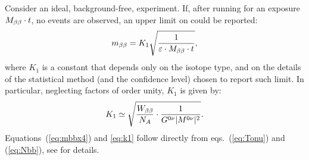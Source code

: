 
Consider an ideal, background-free, experiment. If, after running for an exposure $M_{\beta\beta}\cdot t$, no events are observed, an upper limit on \mbb could be reported:
%
\begin{equation}
m_{\beta\beta} = K_{1} \sqrt{\frac{1}{\varepsilon\cdot M_{\beta\beta} \cdot t}}, \label{eq:mbbx4}
\end{equation}
%
where $K_{1}$ is a constant that depends only on the isotope type, and on the details of the statistical method (and the confidence level) chosen to report such limit. In particular, neglecting factors of order unity, $K_{1}$ is given by:
%
\begin{equation}
K_{1} \simeq \sqrt{\frac{W_{\beta\beta}}{N_A}\cdot \frac{1}{G^{0\nu}\lvert M^{0\nu}\rvert^2}}. \label{eq:k1}
\end{equation}
%
Equations~(\ref{eq:mbbx4}) and \ref{eq:k1} follow directly from eqs.~(\ref{eq:Tonu}) and (\ref{eq:Nbb}), see \cite{Gomez-Cadenas:2010zcc} for details.

